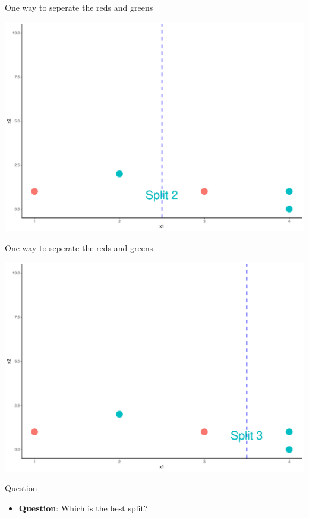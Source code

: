\documentclass[
  ignorenonframetext,
]{beamer}
\providecommand{\tightlist}{%
  \setlength{\itemsep}{0pt}\setlength{\parskip}{0pt}}
\begin{document}
\begin{frame}{One way to seperate the reds and greens}
\protect\hypertarget{one-way-to-seperate-the-reds-and-greens-1}{}

\includegraphics{fa_classification_tree2_files/figure-beamer/unnamed-chunk-3-1.pdf}

\end{frame}

\begin{frame}{One way to seperate the reds and greens}
\protect\hypertarget{one-way-to-seperate-the-reds-and-greens-2}{}

\includegraphics{fa_classification_tree2_files/figure-beamer/unnamed-chunk-4-1.pdf}

\end{frame}

\begin{frame}{Question}
\protect\hypertarget{question}{}

\begin{itemize}
\tightlist
\item
  \textbf{Question}: Which is the best split?
\end{itemize}

\end{frame}
\end{document}
